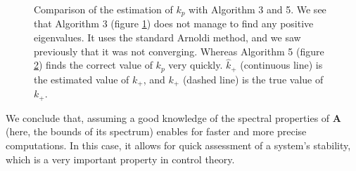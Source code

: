 \documentclass[11pt]{article}
\numberwithin{equation}{section}
\begin{document}
\begin{figure}
    \centering
    \begin{subfigure}[b]{.45\linewidth}
        
        \caption{}
        \label{fig:wrong_kp}
    \end{subfigure}\hspace{0.05\linewidth}
    \begin{subfigure}[b]{.45\linewidth}
        
        \caption{}
        \label{fig:correct_kp}
    \end{subfigure}
    \caption{Comparison of the estimation of $k_p$ with Algorithm 3 and 5. We see that Algorithm 3 (figure \ref{fig:wrong_kp}) does not manage to find any positive eigenvalues. It uses the standard Arnoldi method, and we saw previously that it was not converging. Whereas Algorithm 5 (figure \ref{fig:correct_kp}) finds the correct value of $k_p$ very quickly. $\hat{k}_+$ (continuous line) is the estimated value of $k_+$, and $k_+$ (dashed line) is the true value of $k_+$.}
    \label{fig:kp}
\end{figure}

We conclude that, assuming a good knowledge of the spectral properties of $\mathbf{A}$ (here, the bounds of its spectrum) enables for faster and more precise computations. In this case, it allows for quick assessment of a system's stability, which is a very important property in control theory.
\printbibliography
\end{document}

